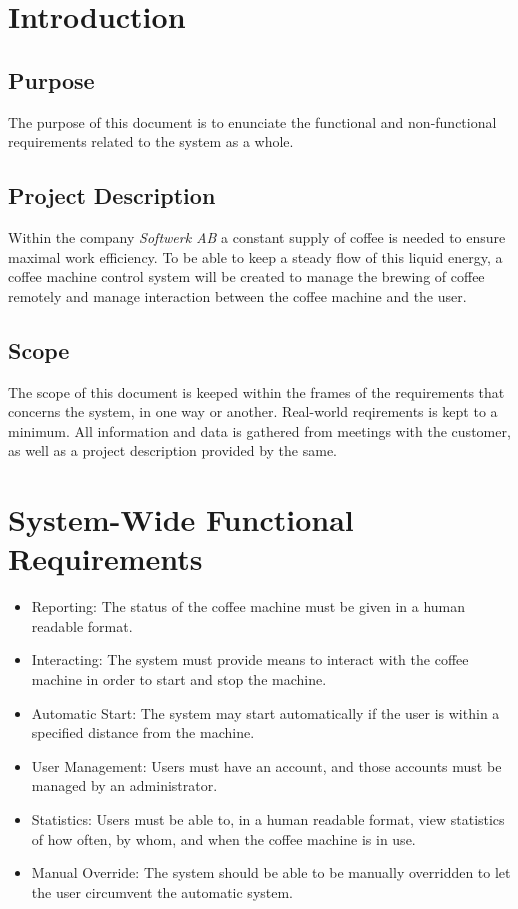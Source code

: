 \section{Introduction}

\subsection{Purpose}

The purpose of this document is to enunciate the functional and non-functional
requirements related to the system as a whole.


\subsection{Project Description}

Within the company \textit{Softwerk AB} a constant supply of coffee is needed to ensure maximal work efficiency. To be able to keep a steady flow of this liquid energy, a coffee machine control system will be created to manage the brewing of coffee remotely and manage interaction between the coffee machine and the user.


\subsection{Scope}

The scope of this document is keeped within the frames of the requirements that concerns the system, in one way or another. Real-world reqirements is kept to a minimum. All information and data is gathered from meetings with the customer, as well as a project description provided by the same.

\section{System-Wide Functional Requirements}

\begin{itemize}
\item Reporting: The status of the coffee machine must be given in a
human readable format.
\item Interacting: The system must provide means to interact with the
coffee machine in order to start and stop the machine.
\item Automatic Start: The system may start automatically if the user is
within a specified distance from the machine.
\item User Management: Users must have an account, and those accounts
must be managed by an administrator.
\item Statistics: Users must be able to, in a human readable format, view statistics of how often, by whom, and when the coffee machine is in use.
\item Manual Override: The system should be able to be manually overridden
to let the user circumvent the automatic system.
\end{itemize}

